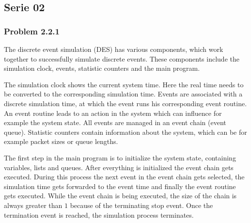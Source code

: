 \subsection*{Serie 02}
\subsubsection*{Problem 2.2.1}
The discrete event simulation (DES) has various components, which work together to successfully simulate discrete events. These components include the simulation clock, events, statistic counters and the main program. 

The simulation clock shows the current system time. Here the real time needs to be converted to the corresponding simulation time. Events are associated with a discrete simulation time, at which the event runs his corresponding event routine. An event routine leads to an action in the system which can influence for example the system state. All events are managed in an event chain (event queue). Statistic counters contain information about the system, which can be for example packet sizes or queue lengths. 

The first step in the main program is to initialize the system state, containing variables, lists and queues. After everything is initialized the event chain gets executed. During this process the next event in the event chain gets selected, the simulation time gets forwarded to the event time and finally the event routine gets executed. While the event chain is being executed, the size of the chain is always greater than $1$ because of the terminating stop event. Once the termination event is reached, the simulation process terminates. 
\newpage
